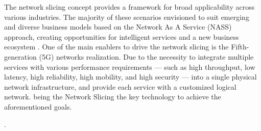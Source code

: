 \documentclass[journal,article,submit,moreauthors,pdftex]{Definitions/mdpi}
\begin{document}
The network slicing concept provides a framework for broad applicability across various industries. The majority of these scenarios envisioned to suit emerging and diverse business models based on the Network As A Service (NASS) approach, creating opportunities for intelligent services and a new business ecosystem \cite{kuklinski2019business,zhang2017network,khan2020network}.\deleted{,} One of the main enablers to drive the network slicing is the Fifth-generation (5G) networks realization. Due to the necessity to integrate multiple services with various performance requirements — such as high throughput, low latency, high reliability, high mobility, and high security — into a single physical network infrastructure, and provide each service with
a customized logical network. being the Network Slicing the key technology to achieve the aforementioned goals. 

  \cite{foukas2017network}.
\end{document}
